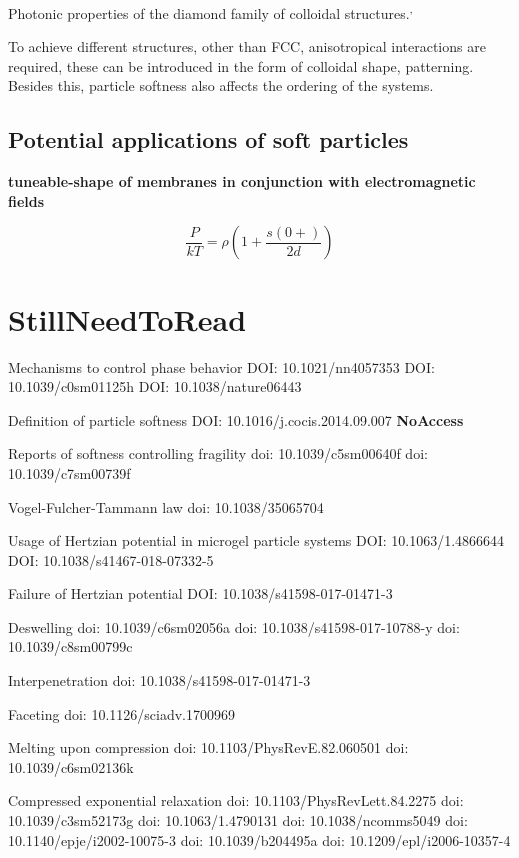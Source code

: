 \documentclass[11pt]{article}
\begin{document}
Photonic properties of the diamond family of colloidal structures.\autocite{Kleinert.2010}\textsuperscript{,}\autocite{Vlasov.2001}

To achieve different structures, other than FCC, anisotropical interactions are required, these can be introduced in the form of colloidal shape, patterning.\autocite{Marson.2019} Besides this, particle softness also affects the ordering of the systems.\autocite{Gnan.2019}

\subsection{Potential applications of soft particles}

\textbf{tuneable-shape of membranes in conjunction with electromagnetic fields}


 





\[ \frac{P}{kT} = \rho \left(1 + \frac{s(0+)}{2d} \right) \]






\section{StillNeedToRead}

Mechanisms to control phase behavior
DOI: 10.1021/nn4057353 
DOI: 10.1039/c0sm01125h 
DOI: 10.1038/nature06443

Definition of particle softness
DOI: 10.1016/j.cocis.2014.09.007  \textbf{NoAccess}

Reports of softness controlling fragility
doi: 10.1039/c5sm00640f 
doi: 10.1039/c7sm00739f

Vogel-Fulcher-Tammann law
doi: 10.1038/35065704 

Usage of Hertzian potential in microgel particle systems
 DOI: 10.1063/1.4866644 
 DOI: 10.1038/s41467-018-07332-5 
 
Failure of Hertzian potential
 DOI: 10.1038/s41598-017-01471-3 
 
Deswelling
doi: 10.1039/c6sm02056a
doi: 10.1038/s41598-017-10788-y
doi: 10.1039/c8sm00799c


Interpenetration
doi: 10.1038/s41598-017-01471-3

Faceting
doi: 10.1126/sciadv.1700969

Melting upon compression
doi: 10.1103/PhysRevE.82.060501
doi: 10.1039/c6sm02136k

Compressed exponential relaxation
doi: 10.1103/PhysRevLett.84.2275
doi: 10.1039/c3sm52173g
doi: 10.1063/1.4790131
doi: 10.1038/ncomms5049
doi: 10.1140/epje/i2002-10075-3
doi: 10.1039/b204495a
doi: 10.1209/epl/i2006-10357-4
\end{document}
